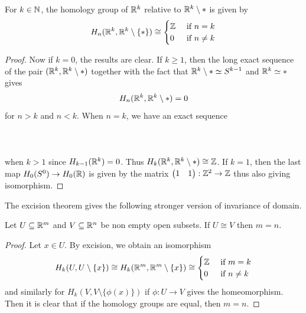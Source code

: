 \documentclass[a4paper]{article}
\begin{document}
\begin{prp}{}{} For $k\in\mathbb{N}$, the homology group of $\mathbb{R}^k$ relative to $\mathbb{R}^k\setminus\ast$ is given by $$H_n(\mathbb{R}^k,\mathbb{R}^k\setminus\{\ast\})\cong\begin{cases}
\mathbb{Z} & \text{ if } n=k\\
0 & \text{ if } n\neq k
\end{cases}$$ \tcbline
\begin{proof}
Now if $k=0$, the results are clear. If $k\geq 1$, then the long exact sequence of the pair $(\mathbb{R}^k,\mathbb{R}^k\setminus\ast)$ together with the fact that $\mathbb{R}^k\setminus\ast\simeq S^{k-1}$ and $\mathbb{R}^k\simeq\ast$ gives $$H_n(\mathbb{R}^k,\mathbb{R}^k\setminus\ast)=0$$ for $n>k$ and $n<k$. When $n=k$, we have an exact sequence \\~\\
\\~\\
when $k>1$ since $H_{k-1}(\mathbb{R}^k)=0$. Thus $H_k(\mathbb{R}^k,\mathbb{R}^k\setminus\ast)\cong\mathbb{Z}$. If $k=1$, then the last map $H_0(S^0)\to H_0(\mathbb{R})$ is given by the matrix $\begin{pmatrix}
1 & 1
\end{pmatrix}:\mathbb{Z}^2\to\mathbb{Z}$ thus also giving isomorphism. 
\end{proof}
\end{prp}

The excision theorem gives the following stronger version of invariance of domain. 

\begin{crl}{}{} Let $U\subseteq\mathbb{R}^m$ and $V\subseteq\mathbb{R}^n$ be non empty open subsets. If $U\cong V$ then $m=n$. \tcbline
\begin{proof}
Let $x\in U$. By excision, we obtain an isomorphism $$H_k(U,U\setminus\{x\})\cong H_k(\mathbb{R}^m,\mathbb{R}^m\setminus\{x\})\cong\begin{cases}
\mathbb{Z} & \text{ if } m=k\\
0 & \text{ if } n\neq k
\end{cases}$$ and similarly for $H_k(V,V\setminus\{\phi(x)\})$ if $\phi:U\to V$ gives the homeomorphism. Then it is clear that if the homology groups are equal, then $m=n$. 
\end{proof}
\end{crl}
\end{document}
